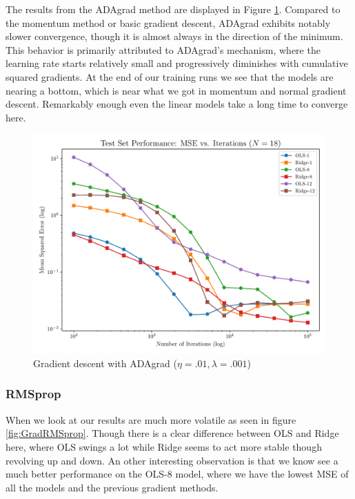 \documentclass[twocolumn,aps]{revtex4}
\begin{document}
The results from the ADAgrad method are displayed in Figure \ref{fig:GradADAgrad}. 
Compared to the momentum method or basic gradient descent, ADAgrad exhibits notably slower convergence, though it is almost always in the direction of the minimum. 
This behavior is primarily attributed to ADAgrad's mechanism, where the learning rate starts relatively small and progressively diminishes with cumulative squared gradients.
At the end of our training runs we see that the models are nearing a bottom, which is near what we got in momentum and normal gradient descent.
Remarkably enough even the linear models take a long time to converge here.
\\

\begin{figure}[h]
    \centering
    \includegraphics[width=.95 \linewidth]{Figures/OLS_Ridge_ADAgrad.pdf}
    \caption{Gradient descent with ADAgrad ($\eta=.01, \lambda=.001$)}
    \label{fig:GradADAgrad}
\end{figure}


\subsubsection{RMSprop}
When we look at our results are much more volatile as seen in figure \ref{fig:GradRMSprop}.
Though there is a clear difference between OLS and Ridge here, where OLS swings a lot while Ridge seems to act more stable though revolving up and down.
An other interesting observation is that we know see a much better performance on the OLS-8 model, where we have the lowest MSE of all the models and the previous gradient methods.
\\
\end{document}
